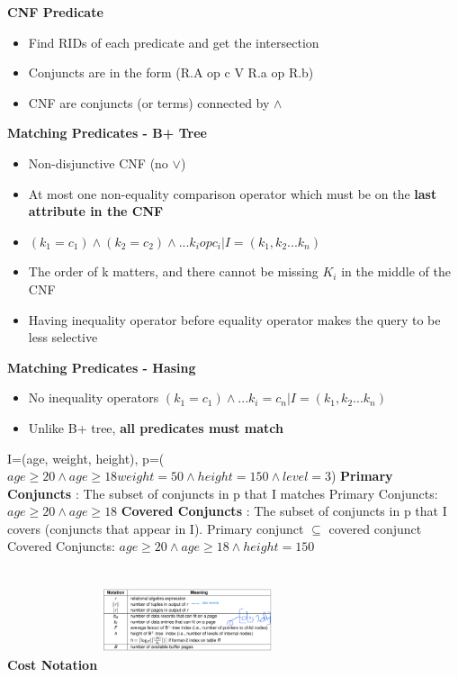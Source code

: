 \documentclass[10pt, landscape]{article}
\begin{document}
\begin{multicols}{4}
\textbf{CNF Predicate}
\begin{itemize}
  \item Find RIDs of each predicate and get the intersection
  \item Conjuncts are in the form (R.A op c V R.a op R.b) 
  \item CNF are conjuncts (or terms) connected by $\land$ 
\end{itemize}

\textbf{Matching Predicates - B+ Tree}
\begin{itemize}
  \item Non-disjunctive CNF (no $\lor$)
  \item At most one non-equality comparison operator which must be on the \textbf{last attribute in the CNF}
  \item $(k_1=c_1) \land (k_2=c_2) \land ...k_i op c_i | I=(k_1, k_2...k_n)$ 
  \item The order of k matters, and there cannot be missing $K_i$ in the middle of the CNF
  \item Having inequality operator before equality operator makes the query to be less selective 
\end{itemize}

\textbf{Matching Predicates - Hasing}
\begin{itemize}
  \item No inequality operators $(k_1=c_1) \land ... k_i =c_n | I=(k_1, k_2...k_n)$
  \item Unlike B+ tree, \textbf{all predicates must match}
\end{itemize}

I=(age, weight, height), p=($age \geq 20 \land age \geq 18 weight=50 \land height=150 \land level=3$) \newline
\textbf{Primary Conjuncts} : The subset of conjuncts in p that I matches \newline
Primary Conjuncts: $age \geq 20 \land age \geq 18$ \newline
\textbf{Covered Conjuncts} : The subset of conjuncts in p that I covers (conjuncts that appear in I). Primary conjunct $\subseteq$ covered conjunct \newline
Covered Conjuncts: $age \geq 20 \land age \geq 18 \land height=150$ \newline

\textbf{Cost Notation}  \newline
\includegraphics[width=5cm, height=3cm]{notation.png}


\end{multicols}
\end{document}
